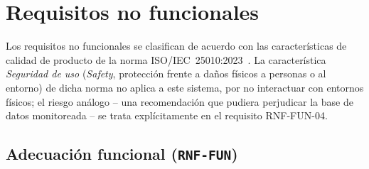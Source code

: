 \documentclass[11pt,a4paper]{report}
\begin{document}
\section{Requisitos no funcionales}
\label{sec:rnf}

Los requisitos no funcionales se clasifican de acuerdo con las caracter\'isticas de calidad de producto de la norma ISO/IEC~25010:2023~\cite{R2}. La caracter\'istica \textit{Seguridad de uso} (\textit{Safety}, protecci\'on frente a da\~nos f\'isicos a personas o al entorno) de dicha norma no aplica a este sistema, por no interactuar con entornos f\'isicos; el riesgo an\'alogo -- una recomendaci\'on que pudiera perjudicar la base de datos monitoreada -- se trata expl\'icitamente en el requisito RNF-FUN-04.

\subsection{Adecuaci\'on funcional (\texttt{RNF-FUN})}
\end{document}
